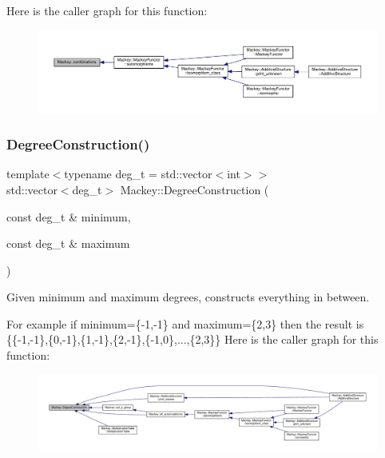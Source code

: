 Here is the caller graph for this function\+:\nopagebreak
\begin{figure}[H]
\begin{center}
\leavevmode
\includegraphics[width=350pt]{namespaceMackey_a3a4b7761ed7274b145eed9a451b53e61_icgraph}
\end{center}
\end{figure}
\mbox{\label{namespaceMackey_a49fef6f64b67ff118d35ac45b9c92972}} 
\subsubsection{\texorpdfstring{Degree\+Construction()}{DegreeConstruction()}}
{\footnotesize\ttfamily template$<$typename deg\+\_\+t  = std\+::vector$<$int$>$$>$ \\
std\+::vector$<$deg\+\_\+t$>$ Mackey\+::\+Degree\+Construction (\begin{DoxyParamCaption}\item[{const deg\+\_\+t \&}]{minimum,  }\item[{const deg\+\_\+t \&}]{maximum }\end{DoxyParamCaption})}



Given minimum and maximum degrees, constructs everything in between. 

For example if minimum=\{-\/1,-\/1\} and maximum=\{2,3\} then the result is \{\{-\/1,-\/1\},\{0,-\/1\},\{1,-\/1\},\{2,-\/1\},\{-\/1,0\},...,\{2,3\}\} Here is the caller graph for this function\+:\nopagebreak
\begin{figure}[H]
\begin{center}
\leavevmode
\includegraphics[width=350pt]{namespaceMackey_a49fef6f64b67ff118d35ac45b9c92972_icgraph}
\end{center}
\end{figure}
\mbox{\label{namespaceMackey_a6a5d40e69e5628ea84896ee43f4a91fa}} 
